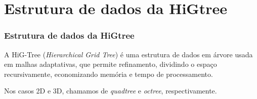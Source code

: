 \documentclass[../main/main.tex]{subfiles}
\begin{document}
	
\section{Estrutura de dados da HiGtree}

\begin{frame}
	\frametitle{Estrutura de dados da HiGtree}
\end{frame}


\begin{frame}
	\begin{block}{}
    A HiG-Tree (\textit{Hierarchical Grid Tree}) é uma estrutura de dados em
    árvore usada em malhas adaptativas, que permite refinamento, dividindo o
    espaço recursivamente, economizando memória e tempo de processamento.
	\end{block}
	
	\begin{block}{}
		Nos casos 2D e 3D, chamamos de \textit{quadtree} e \textit{octree}, respectivamente.
	\end{block}
\end{frame}
\end{document}
